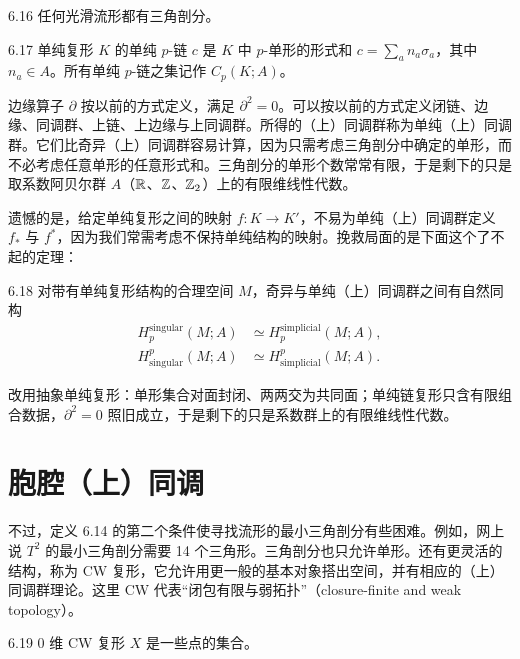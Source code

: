 \begin{proposition}{6.16}
  任何光滑流形都有三角剖分。
\end{proposition}

\begin{definition}{6.17}
  单纯复形 $K$ 的单纯 $p$-链 $c$ 是 $K$ 中 $p$-单形的形式和 $c=\sum_an_a\sigma_a$，其中 $n_a\in A$。所有单纯 $p$-链之集记作 $C_p(K;A)$。
\end{definition}

边缘算子 $\partial$ 按以前的方式定义，满足 $\partial^2=0$。可以按以前的方式定义闭链、边缘、同调群、上链、上边缘与上同调群。所得的（上）同调群称为单纯（上）同调群。它们比奇异（上）同调群容易计算，因为只需考虑三角剖分中确定的单形，而不必考虑任意单形的任意形式和。三角剖分的单形个数常常有限，于是剩下的只是取系数阿贝尔群 $A$（$\mathbb{R}$、$\mathbb{Z}$、$\mathbb{Z}_2$）上的有限维线性代数。

遗憾的是，给定单纯复形之间的映射 $f:K\to K'$，不易为单纯（上）同调群定义 $f_*$ 与 $f^*$，因为我们常需考虑不保持单纯结构的映射。挽救局面的是下面这个了不起的定理：

\begin{theorem}{6.18}
  对带有单纯复形结构的合理空间 $M$，奇异与单纯（上）同调群之间有自然同构
  \begin{align}
    H_p^{\mathrm{singular}}(M;A)&\simeq H_p^{\mathrm{simplicial}}(M;A), \tag{6.10}\\
    H^p_{\mathrm{singular}}(M;A)&\simeq H^p_{\mathrm{simplicial}}(M;A). \tag{6.11}
  \end{align}
\end{theorem}


改用抽象单纯复形：单形集合对面封闭、两两交为共同面；单纯链复形只含有限组合数据，$\partial^2=0$ 照旧成立，于是剩下的只是系数群上的有限维线性代数。

\section{胞腔（上）同调}

不过，定义 6.14 的第二个条件使寻找流形的最小三角剖分有些困难。例如，网上说 $T^2$ 的最小三角剖分需要 14 个三角形。三角剖分也只允许单形。还有更灵活的结构，称为 CW 复形，它允许用更一般的基本对象搭出空间，并有相应的（上）同调群理论。这里 CW 代表“闭包有限与弱拓扑”（closure-finite and weak topology）。

\begin{definition}{6.19}
  0 维 CW 复形 $X$ 是一些点的集合。
\end{definition}

